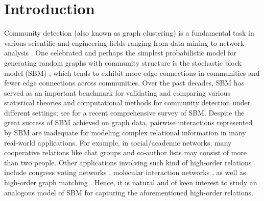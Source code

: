 \documentclass{article}
\theoremstyle{plain}
\theoremstyle{definition}
\theoremstyle{remark}
\begin{document}
	\section{Introduction}
Community detection (also known as graph clustering) is a fundamental task in various scientific and engineering fields ranging from data mining \citep{cabreros2016detecting,shi2000normalized} to network analysis \citep{girvan2002community}. One celebrated and perhaps the simplest probabilistic model for generating random graphs with community structure is the stochastic block model (SBM) \citep{holland1983stochastic}, which tends to exhibit more edge connections in communities and fewer edge connections across communities. Over the past decades, SBM has served as an important benchmark for validating and comparing various statistical theories and computational methods for community detection under different settings; see \citet{abbe2017community} for a recent comprehensive survey of SBM. Despite the great success of SBM achieved on graph data, pairwise interactions represented by SBM are inadequate for modeling complex relational information in many real-world applications. For example, in social/academic networks, many cooperative relations like chat groups and co-author lists may consist of more than two people. Other applications involving such kind of high-order relations include congress voting
networks \citep{lee2017time}, molecular interaction
networks \citep{michoel2012alignment}, as well as high-order graph matching \citep{duchenne2011tensor}. Hence, it is natural and of keen interest to study an analogous model of SBM for capturing the aforementioned high-order relations.
\end{document}

